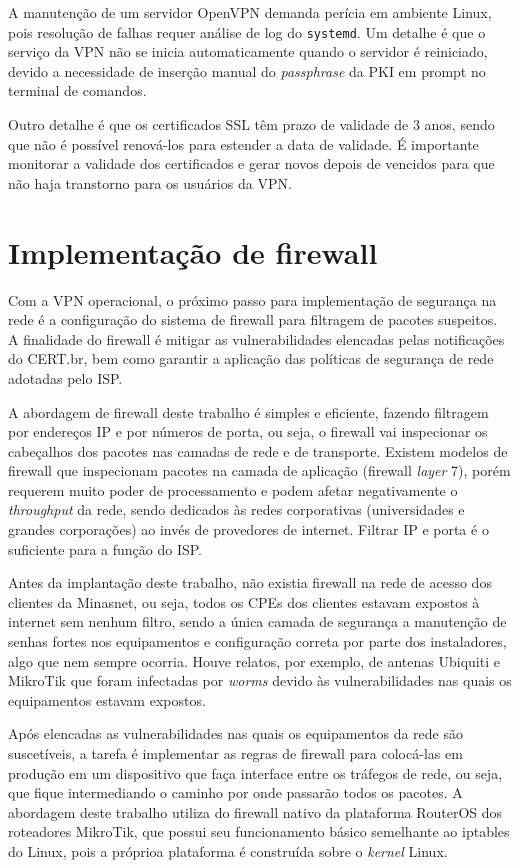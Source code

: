     A manutenção de um servidor OpenVPN demanda perícia em ambiente Linux, pois resolução de falhas requer análise de log do {\tt systemd}. Um detalhe é que o serviço da VPN não se inicia automaticamente quando o servidor é reiniciado, devido a necessidade de inserção manual do \textit{passphrase} da PKI em prompt no terminal de comandos.
    
    Outro detalhe é que os certificados SSL têm prazo de validade de 3 anos, sendo que não é possível renová-los para estender a data de validade. É importante monitorar a validade dos certificados e gerar novos depois de vencidos para que não haja transtorno para os usuários da VPN.
    
\section{Implementação de firewall}

    Com a VPN operacional, o próximo passo para implementação de segurança na rede é a configuração do sistema de firewall para filtragem de pacotes suspeitos. A finalidade do firewall é mitigar as vulnerabilidades elencadas pelas notificações do CERT.br, bem como garantir a aplicação das políticas de segurança de rede adotadas pelo ISP.
    
    A abordagem de firewall deste trabalho é simples e eficiente, fazendo filtragem por endereços IP e por números de porta, ou seja, o firewall vai inspecionar os cabeçalhos dos pacotes nas camadas de rede e de transporte. Existem modelos de firewall que inspecionam pacotes na camada de aplicação (firewall \textit{layer} 7), porém requerem muito poder de processamento e podem afetar negativamente o \textit{throughput} da rede, sendo dedicados às redes corporativas (universidades e grandes corporações) ao invés de provedores de internet. Filtrar IP e porta é o suficiente para a função do ISP.
    
    Antes da implantação deste trabalho, não existia firewall na rede de acesso dos clientes da Minasnet, ou seja, todos os CPEs dos clientes estavam expostos à internet sem nenhum filtro, sendo a única camada de segurança a manutenção de senhas fortes nos equipamentos e configuração correta por parte dos instaladores, algo que nem sempre ocorria. Houve relatos, por exemplo, de antenas Ubiquiti e MikroTik que foram infectadas por \textit{worms} devido às vulnerabilidades nas quais os equipamentos estavam expostos.
    
    Após elencadas as vulnerabilidades nas quais os equipamentos da rede são suscetíveis, a tarefa é implementar as regras de firewall para colocá-las em produção em um dispositivo que faça interface entre os tráfegos de rede, ou seja, que fique intermediando o caminho por onde passarão todos os pacotes. A abordagem deste trabalho utiliza do firewall nativo da plataforma RouterOS dos roteadores MikroTik, que possui seu funcionamento básico semelhante ao iptables do Linux, pois a próprioa plataforma é construída sobre o \textit{kernel} Linux.
    
